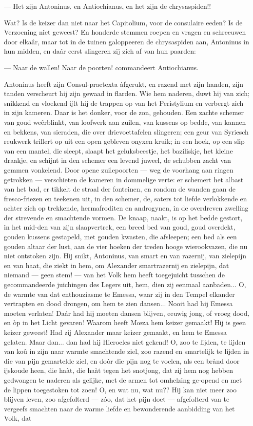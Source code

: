 \documentclass[a4paper, 12pt, oneside, dutch]{article}
\begin{document}
--- Het zijn Antoninus, en Antiochianus, en het zijn de chrysaspiden!!

Wat? Is de keizer dan niet naar het Capitolium, voor de consulaire eeden? Is de Verzoening niet geweest? En honderde stemmen roepen en vragen en schreeuwen door elkaâr, maar tot in de tuinen galoppeeren de chrysaspiden aan, Antoninus in hun midden, en daár eerst slingeren zij zich af van hun paarden:

--- Naar de wallen! Naar de poorten! commandeert Antiochianus.

Antoninus heeft zijn Consul-praetexta àfgerukt, en razend met zijn handen, zijn tanden verscheurt hij zijn gewaad in flarden. Wie hem naderen, duwt hij van zich; snikkend en vloekend ijlt hij de trappen op van het Peristylium en verbergt zich in zijn kameren. Daar is het donker, voor de zon, gehouden. Een zachte schemer van goud weêrblinkt, van loofwerk aan zuilen, van kussens op bedde, van kannen en bekkens, van sieraden, die over drievoettafelen slingeren; een geur van Syriesch reukwerk trillert op uit een open gebleven onyxen kruik; in een hoek, op een slip van een mantel, die sleept, slaapt het geluksbeestje, het baziliskje, het kleine draakje, en schijnt in den schemer een levend juweel, de schubben zacht van gemmen vonkelend. Door opene zuilepoorten --- weg de voorhang aan ringen getrokken --- verschieten de kameren in dommelige verte: er schemert het albast van het bad, er tikkelt de straal der fonteinen, en rondom de wanden gaan de fresco-friezen en teekenen uit, in den schemer, de, saters tot liefde verlokkende en achter zich op trekkende, hermafroditen en androgynen, in de overdreven zwelling der strevende en smachtende vormen. De knaap, naakt, is op het bedde gestort, in het mid-den van zijn slaapvertrek, een breed bed van goud, goud overdekt, gouden kussens gestapeld, met gouden kwasten, die afsleepen; een bed als een gouden altaar der lust, aan de vier hoeken der treden hooge wierookvazen, die nu niet ontstoken zijn. Hij snikt, Antoninus, van smart en van razernij, van zielepijn en van haat, die ziekt in hem, om Alexander smartrazernij en zielepijn, dat niemand --- geen stem! --- van het Volk hem heeft toegejuicht tusschen de gecommandeerde juichingen des Legers uit, hem, dien zij eenmaal aanbaden... O, de warmte van dat enthouziasme te Emessa, waar zij in den Tempel elkander vertrapten en dood drongen, om hem te zien dansen... Nooit had hij Emessa moeten verlaten! Daár had hij moeten dansen blijven, eeuwig jong, of vroeg dood, en òp in het Licht gevaren! Waarom heeft Mœza hem keizer gemaakt! Hij is geen keizer geweest! Had zij Alexander maar keizer gemaakt, en hem te Emessa gelaten. Maar dan... dan had hij Hierocles niet gekend! O, zoo te lijden, te lijden van koû in zijn naar warmte smachtende ziel, zoo razend en smartelijk te lijden in die van pijn gemartelde ziel, en doòr die pijn nog te voelen, als een brànd door ijskoude heen, die haàt, die haàt tegen het snotjong, dat zij hem nog hebben gedwongen te naderen als gelijke, met de armen tot omhelzing ge-opend en met de lippen toegestoken tot zoen! O, en wat nu, wat nu?? Hij kan niet meer zoo blijven leven, zoo afgefolterd --- zóo, dat het pijn doet --- afgefolterd van te vergeefs smachten naar de warme liefde en bewonderende aanbidding van het Volk, dat 
\end{document}
